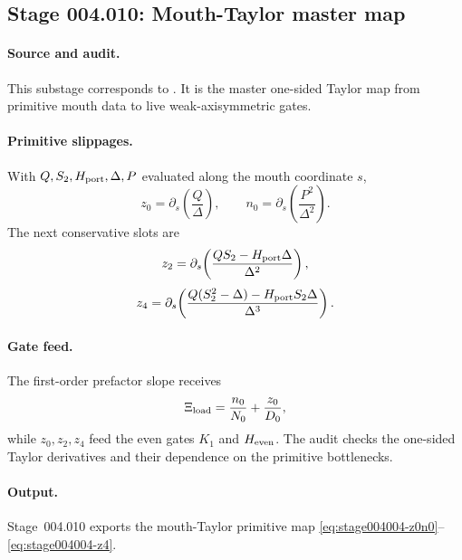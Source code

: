 \subsection*{Stage 004.010: Mouth-Taylor master map}
\label{subsec:stage004010-mouth-taylor-master}

\paragraph{Source and audit.}
This substage corresponds to
.
It is the master one-sided Taylor map from primitive mouth data to live
weak-axisymmetric gates.

\paragraph{Primitive slippages.}
With \(Q,S_2,H_{\rm port},\Delta,P\) evaluated along the mouth coordinate \(s\),
\begin{equation}
\label{eq:stage004004-z0n0}
z_0=\partial_s\!\left(\frac{Q}{\Delta}\right),
\qquad
n_0=\partial_s\!\left(\frac{P^2}{\Delta^2}\right).
\end{equation}
The next conservative slots are
\begin{equation}
\label{eq:stage004004-z2}
z_2=\partial_s\!\left(\frac{QS_2-H_{\rm port}\Delta}{\Delta^2}\right),
\end{equation}
\begin{equation}
\label{eq:stage004004-z4}
z_4=\partial_s\!\left(
\frac{Q(S_2^2-\Delta)-H_{\rm port}S_2\Delta}{\Delta^3}
\right).
\end{equation}

\paragraph{Gate feed.}
The first-order prefactor slope receives
\begin{equation}
\label{eq:stage004010-xi}
\Xi_{\rm load}=\frac{n_0}{N_0}+\frac{z_0}{D_0},
\end{equation}
while \(z_0,z_2,z_4\) feed the even gates \(K_1\) and \(H_{\rm even}\).  The
audit checks the one-sided Taylor derivatives and their dependence on the
primitive bottlenecks.

\paragraph{Output.}
Stage~004.010 exports the mouth-Taylor primitive map
\eqref{eq:stage004004-z0n0}--\eqref{eq:stage004004-z4}.
